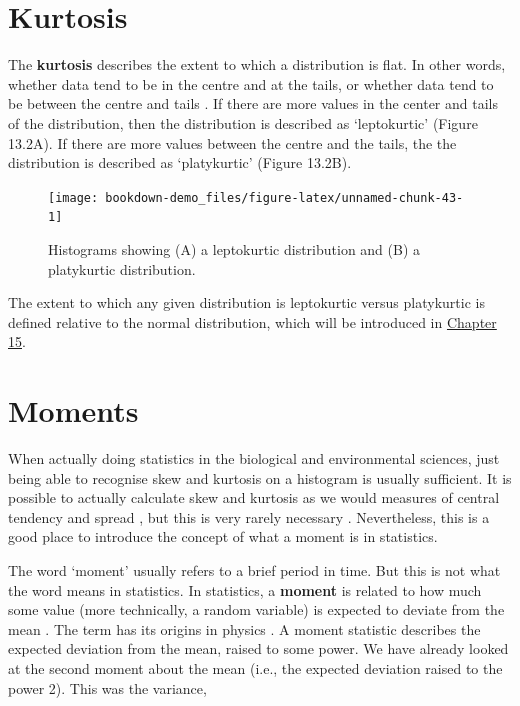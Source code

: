 \documentclass[
  openany]{krantz}
\begin{document}
\hypertarget{kurtosis}{%
\section{Kurtosis}\label{kurtosis}}

The \textbf{kurtosis} describes the extent to which a distribution is flat.
In other words, whether data tend to be in the centre and at the tails, or whether data tend to be between the centre and tails \citep{Sokal1995}.
If there are more values in the center and tails of the distribution, then the distribution is described as `leptokurtic' (Figure 13.2A).
If there are more values between the centre and the tails, the the distribution is described as `platykurtic' (Figure 13.2B).

\begin{figure}
\texttt{[image: bookdown-demo\_files/figure-latex/unnamed-chunk-43-1]} \caption{Histograms showing (A) a leptokurtic distribution and (B) a platykurtic distribution.}\label{fig:unnamed-chunk-43}
\end{figure}

The extent to which any given distribution is leptokurtic versus platykurtic is defined relative to the normal distribution, which will be introduced in \protect\hyperlink{Chapter_15}{Chapter 15}.

\hypertarget{moments}{%
\section{Moments}\label{moments}}

When actually doing statistics in the biological and environmental sciences, just being able to recognise skew and kurtosis on a histogram is usually sufficient.
It is possible to actually calculate skew and kurtosis as we would measures of central tendency and spread \citep{Rahman1968, Groeneveld1984, Sokal1995}, but this is very rarely necessary \citep[but see][]{Doane2011}.
Nevertheless, this is a good place to introduce the concept of what a moment is in statistics.

The word `moment' usually refers to a brief period in time.
But this is not what the word means in statistics.
In statistics, a \textbf{moment} is related to how much some value (more technically, a random variable) is expected to deviate from the mean \citep{Upton2014}.
The term has its origins in physics \citep{Sokal1995, Miller2004}.
A moment statistic describes the expected deviation from the mean, raised to some power.
We have already looked at the second moment about the mean (i.e., the expected deviation raised to the power 2).
This was the variance,
\end{document}
